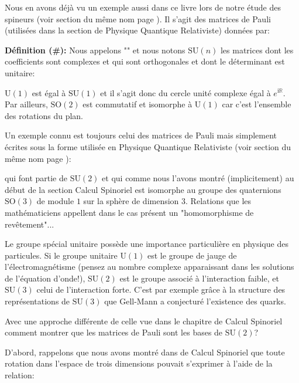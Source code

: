 	
	Nous en avons déjà vu un exemple aussi dans ce livre lors de notre étude des spineurs (voir section du même nom page \pageref{spinors}). Il s'agit des matrices de Pauli (utilisées dans la section de Physique Quantique Relativiste) données par:
	
	\textbf{Définition (\#\mydef):} Nous appelons "\label{special unitary group}" et nous notons $\text{SU}(n)$ les matrices dont les coefficients sont complexes et qui sont orthogonales et dont le déterminant est unitaire:
	
	\begin{tcolorbox}[title=Remarque,colframe=black,arc=10pt]
	$\text{U}(1)$ est égal à $\text{SU}(1)$ et il s'agit donc du cercle unité complexe égal à $e^{\mathrm{i}\mathbb{R}}$. Par ailleurs, $\text{SO}(2)$ est commutatif et isomorphe à $\text{U}(1)$ car c'est l'ensemble des rotations du plan.
	\end{tcolorbox}
	Un exemple connu est toujours celui des matrices de Pauli mais simplement écrites sous la forme utilisée en Physique Quantique Relativiste (voir section du même nom page \pageref{pauli matrices}):
		
	qui font partie de $\text{SU}(2)$ et qui comme nous l'avons montré (implicitement) au début de la section Calcul Spinoriel est isomorphe au groupe des quaternions $\text{SO} (3)$ de module $1$ sur la sphère de dimension $3$. Relations que les mathématiciens appellent dans le cas présent un "homomorphisme de revêtement"...
	\begin{tcolorbox}[title=Remarque,colframe=black,arc=10pt]
	Le groupe spécial unitaire possède une importance particulière en physique des particules. Si le groupe unitaire $\text{U}(1)$ est le groupe de jauge de l'électromagnétisme (pensez au nombre complexe apparaissant dans les solutions de l'équation d'onde!),  $\text{SU}(2)$ est le groupe associé à l'interaction faible, et $\text{SU} (3)$ celui de l'interaction forte. C'est par exemple grâce à la structure des représentations de $\text{SU}(3)$ que Gell-Mann a conjecturé l'existence des quarks.
	\end{tcolorbox}
	Avec une approche différente de celle vue dans le chapitre de Calcul Spinoriel comment montrer que les matrices de Pauli sont les bases de $\text{SU}(2)$?
	
	D'abord, rappelons que nous avons montré dans de Calcul Spinoriel que toute rotation dans l'espace de trois dimensions pouvait s'exprimer à l'aide de la relation:
	
